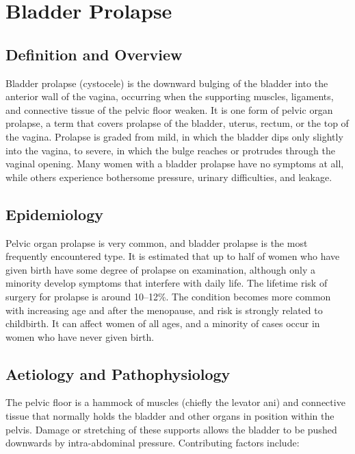 \chapter{Bladder Prolapse}

\section*{Definition and Overview}
Bladder prolapse (cystocele) is the downward bulging of the bladder into the anterior wall of the vagina, occurring when the supporting muscles, ligaments, and connective tissue of the pelvic floor weaken. It is one form of pelvic organ prolapse, a term that covers prolapse of the bladder, uterus, rectum, or the top of the vagina. Prolapse is graded from mild, in which the bladder dips only slightly into the vagina, to severe, in which the bulge reaches or protrudes through the vaginal opening. Many women with a bladder prolapse have no symptoms at all, while others experience bothersome pressure, urinary difficulties, and leakage.

\section*{Epidemiology}
Pelvic organ prolapse is very common, and bladder prolapse is the most frequently encountered type. It is estimated that up to half of women who have given birth have some degree of prolapse on examination, although only a minority develop symptoms that interfere with daily life. The lifetime risk of surgery for prolapse is around 10--12\%. The condition becomes more common with increasing age and after the menopause, and risk is strongly related to childbirth. It can affect women of all ages, and a minority of cases occur in women who have never given birth.

\section*{Aetiology and Pathophysiology}
The pelvic floor is a hammock of muscles (chiefly the levator ani) and connective tissue that normally holds the bladder and other organs in position within the pelvis. Damage or stretching of these supports allows the bladder to be pushed downwards by intra-abdominal pressure. Contributing factors include:

